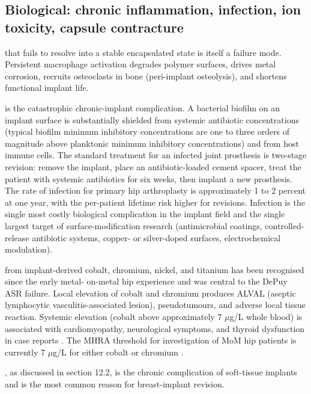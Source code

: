 \subsection{Biological: chronic inflammation, infection, ion toxicity, capsule contracture}

 that fails to resolve into a stable
encapsulated state is itself a failure mode. Persistent macrophage
activation degrades polymer surfaces, drives metal corrosion,
recruits osteoclasts in bone (peri-implant osteolysis), and
shortens functional implant life.

 is the catastrophic chronic-implant
complication. A bacterial biofilm on an implant surface is
substantially shielded from systemic antibiotic concentrations
(typical biofilm minimum inhibitory concentrations are one to three
orders of magnitude above planktonic minimum inhibitory
concentrations) and from host immune cells. The standard
treatment for an infected joint prosthesis is two-stage revision:
remove the implant, place an antibiotic-loaded cement spacer, treat
the patient with systemic antibiotics for six weeks, then implant
a new prosthesis. The rate of infection for primary hip arthroplasty
is approximately 1 to 2 percent at one year, with the per-patient
lifetime risk higher for revisions. Infection is the single most
costly biological complication in the implant field and the
single largest target of surface-modification research
(antimicrobial coatings, controlled-release antibiotic systems,
copper- or silver-doped surfaces, electrochemical modulation).

 from implant-derived cobalt, chromium,
nickel, and titanium has been recognised since the early metal-
on-metal hip experience and was central to the DePuy ASR failure.
Local elevation of cobalt and chromium produces ALVAL (aseptic
lymphocytic vasculitis-associated lesion), pseudotumours, and
adverse local tissue reaction. Systemic elevation (cobalt above
approximately 7 $\mu$g/L whole blood) is associated with
cardiomyopathy, neurological symptoms, and thyroid dysfunction in
case reports
\cite{paper:v6c12-jacobs-metal-ions-2003,
paper:v6c12-cohen-mom-bmj-2012}. The MHRA threshold for
investigation of MoM hip patients is currently 7 $\mu$g/L for
either cobalt or chromium
\cite{web:v6c12-mhra-mom-2012}.

, as discussed in section 12.2, is
the chronic complication of soft-tissue implants and is the most
common reason for breast-implant revision.

